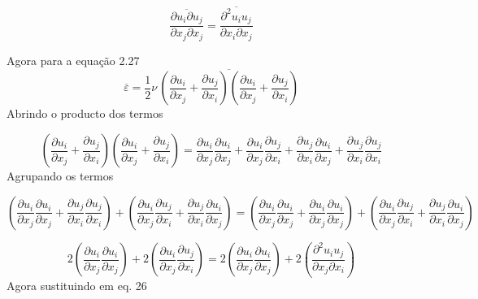 \documentclass[12pt]{article}
\begin{document}
\begin{equation}
	\frac{\overline{\partial u_i \partial u_j}}{\partial x_j \partial x_j} = \frac{\overline{\partial ^2 u_i u_j}}{\partial x_i \partial x_j}
\end{equation}


Agora para a equação 2.27 
\begin{equation}
	\overline{\varepsilon} = \frac{1}{2} \nu \, \overline{
		\left( \frac{\partial u_i}{\partial x_j} + \frac{\partial u_j}{\partial x_i} \right)
		\left( \frac{\partial u_i}{\partial x_j} + \frac{\partial u_j}{\partial x_i} \right)
	}
\end{equation}
Abrindo o producto dos termos

\begin{equation}
	\left( \frac{\partial u_i}{\partial x_j} + \frac{\partial u_j}{\partial x_i} \right)
	\left( \frac{\partial u_i}{\partial x_j} + \frac{\partial u_j}{\partial x_i} \right) = \frac{\partial u_i}{\partial x_j}\frac{\partial u_i}{\partial x_j} + \frac{\partial u_i}{\partial x_j}\frac{\partial u_j}{\partial x_i} + \frac{\partial u_j}{\partial x_i}\frac{\partial u_i}{\partial x_j} + \frac{\partial u_j}{\partial x_i}\frac{\partial u_j}{\partial x_i}
\end{equation}
 Agrupando os termos
 
\begin{equation}
	 \left( \frac{\partial u_i}{\partial x_j}\frac{\partial u_i}{\partial x_j} +  \frac{\partial u_j}{\partial x_i}\frac{\partial u_j}{\partial x_i} \right) + \left(  \frac{\partial u_i}{\partial x_j}\frac{\partial u_j}{\partial x_i} + \frac{\partial u_j}{\partial x_i}\frac{\partial u_i}{\partial x_j} \right) = 
	 \left( \frac{\partial u_i}{\partial x_j}\frac{\partial u_i}{\partial x_j} +  \frac{\partial u_i}{\partial x_j}\frac{\partial u_i}{\partial x_j} \right) + \left(  \frac{\partial u_i}{\partial x_j}\frac{\partial u_j}{\partial x_i} + \frac{\partial u_j}{\partial x_i}\frac{\partial u_i}{\partial x_j} \right)
\end{equation}

\begin{equation}
	2\left( \frac{\partial u_i}{\partial x_j}\frac{\partial u_i}{\partial x_j}  \right) + 2\left(  \frac{\partial u_i}{\partial x_j}\frac{\partial u_j}{\partial x_i} \right) = 2\left( \frac{\partial u_i}{\partial x_j}\frac{\partial u_i}{\partial x_j}  \right) + 2\left(  \frac{\partial ^2 u_i u_j}{\partial x_j \partial x_i} \right)
\end{equation}
Agora sustituindo em eq. 26
\end{document}
